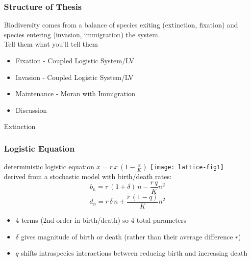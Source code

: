 \documentclass{beamer}
\begin{document}
\begin{frame}
\frametitle{Structure of Thesis}
Biodiversity comes from a balance of species exiting (extinction, fixation) and species entering (invasion, immigration) the system. \\
\Large{Tell them what you'll tell them}
\begin{itemize}
	\item Fixation - Coupled Logistic System/LV
	\item Invasion - Coupled Logistic System/LV
	\item Maintenance - Moran with Immigration
	\item Discussion
\end{itemize}
\end{frame}



\begin{frame}
\centering
{{\Huge Extinction}}
\end{frame}

\begin{frame}
\frametitle{Logistic Equation}
deterministic logistic equation $\dot{x} = r \, x \, \left(1-\frac{x}{K}\right)$
\pause
\centering
\texttt{[image: lattice-fig1]} \\
\pause
derived from a stochastic model with birth/death rates:
\begin{equation*}
b_n = r\,(1 + \delta)\,n - \frac{r\,q}{K}n^2%
\label{birth}
\end{equation*}
\begin{equation*}
d_n = r\,\delta\,n + \frac{r\,(1-q)}{K} n^2%
\label{death}
\end{equation*}
\vspace{-0.2cm}
\pause
\begin{itemize}
\item 4 terms (2nd order in birth/death) so 4 total parameters
\item $\delta$ gives magnitude of birth or death (rather than their average difference $r$)
\item $q$ shifts intraspecies interactions between reducing birth and increasing death
\end{itemize}
\end{frame}
\end{document}
